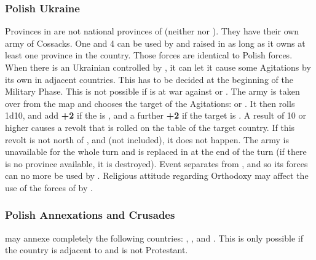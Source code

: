 \subsubsection{Polish Ukraine}
\label{chSpecific:Poland:Polish Ukraine}
\aparag Provinces in  are not national provinces of \POL
(neither  nor ). They have their own army
of Cossacks.
\bparag One \ARMY and 4 \LD can be used by \POL and raised in
 as long as it owns at least one province in the country.
Those forces are identical to Polish forces.
\bparag When there is an Ukrainian \ARMY controlled by \POL, it can let
it cause some Agitations by its own in adjacent countries. This has to
be decided at the beginning of the Military Phase. This is not possible
if \POL is at war against \TUR or .
\bparag The army is taken over from the map and \POL chooses the target
of the Agitations: \RUS or \TUR.  It then rolls 1d10, and add {\bf +2}
if the \ARMY is \Faceplus, and a further {\bf +2} if the target is
\TUR. A result of 10 or higher causes a revolt that is rolled on the
table of the target country.  If this revolt is not north of
,  and  (not
included), it does not happen.  The army is unavailable for the whole
turn and is replaced in  at the end of the turn (if there
is no province available, it is destroyed).
\aparag Event  separates 
from \POL, and so its forces can no more be used by \POL.
\aparag Religious attitude regarding Orthodoxy may affect the use of the
forces of  by \POL.

\subsubsection{Polish Annexations and Crusades}
\aparag \POL may annexe completely the following countries: ,
,  and .  This is only
possible if the country is adjacent to \POL and \POL is not Protestant.

